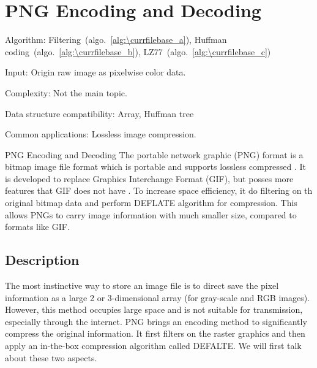 \documentclass[catalog.tex]{subfiles}
\begin{document}
%
%

\def\pbname{PNG Encoding and Decoding} %

\section{\pbname} 

\begin{overview}
\item [Algorithm:] Filtering~(algo.~\ref{alg:\currfilebase_a}), Huffman coding~(algo.~\ref{alg:\currfilebase_b}), LZ77~(algo.~\ref{alg:\currfilebase_c}) 
\item [Input:] Origin raw image as pixelwise color data.
\item [Complexity:] Not the main topic.
\item [Data structure compatibility:] Array, Huffman tree
\item [Common applications:] Lossless image compression.
\end{overview}


\begin{problem}{\pbname}
    The portable network graphic (PNG) format is a bitmap image file format which is portable and supports lossless compressed \cite{boutell1997png}. It is developed to replace Graphics Interchange Format (GIF), but posses more features that GIF does not have \cite{boutell1997png}. To increase space efficiency, it do filtering on th original bitmap data and perform DEFLATE algorithm for compression. This allows PNGs to carry image information with much smaller size, compared to formats like GIF.
\end{problem}


\subsection*{Description}

The most instinctive way to store an image file is to direct save the pixel information as a large 2 or 3-dimensional array (for gray-scale and RGB images). However, this method occupies large space and is not suitable for transmission, especially through the internet. PNG brings an encoding method  to significantly compress the original information. It first filters on the raster graphics and then apply an in-the-box compression algorithm called DEFALTE. We will first talk about these two aspects.
\end{document}
